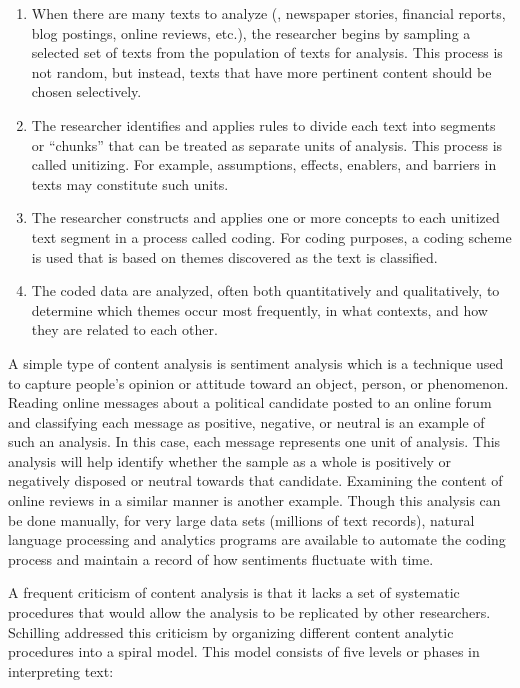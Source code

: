 \begin{enumerate}
	\item When there are many texts to analyze (\eg, newspaper stories, financial reports, blog postings, online reviews, etc.), the researcher begins by sampling a selected set of texts from the population of texts for analysis. This process is not random, but instead, texts that have more pertinent content should be chosen selectively. 

	\item The researcher identifies and applies rules to divide each text into segments or ``chunks'' that can be treated as separate units of analysis. This process is called unitizing. For example, assumptions, effects, enablers, and barriers in texts may constitute such units.

	\item The researcher constructs and applies one or more concepts to each unitized text segment in a process called coding. For coding purposes, a coding scheme is used that is based on themes discovered as the text is classified.

	\item The coded data are analyzed, often both quantitatively and qualitatively, to determine which themes occur most frequently, in what contexts, and how they are related to each other.
\end{enumerate}

A simple type of content analysis is sentiment analysis which is a technique used to capture people's opinion or attitude toward an object, person, or phenomenon. Reading online messages about a political candidate posted to an online forum and classifying each message as positive, negative, or neutral is an example of such an analysis. In this case, each message represents one unit of analysis. This analysis will help identify whether the sample as a whole is positively or negatively disposed or neutral towards that candidate. Examining the content of online reviews in a similar manner is another example. Though this analysis can be done manually, for very large data sets (millions of text records), natural language processing and analytics programs are available to automate the coding process and maintain a record of how sentiments fluctuate with time.

A frequent criticism of content analysis is that it lacks a set of systematic procedures that would allow the analysis to be replicated by other researchers. Schilling\cite{schilling2006pragmatics} addressed this criticism by organizing different content analytic procedures into a spiral model. This model consists of five levels or phases in interpreting text: 

